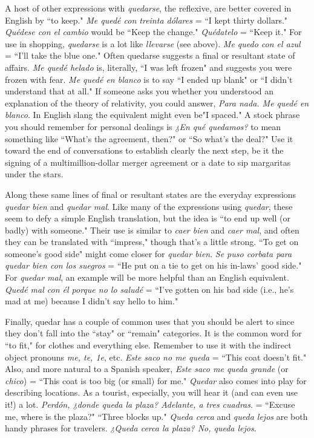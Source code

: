 A host of other expressions with \emph{quedarse}, the reflexive, are
better covered in English by ``to keep." \emph{Me quedé con treinta dólares}
= ``I kept thirty dollars." \emph{Quédese con el cambio} would be ``Keep the
change." \emph{Quédatelo} = ``Keep it." For use in shopping, \emph{quedarse} is a
lot like \emph{llevarse} (see above). \emph{Me quedo con el azul} = ``I'll take the blue
one." Often quedarse suggests a final or resultant state of affairs. \emph{Me
	quedé helado} is, literally, ``I was left frozen" and suggests you were frozen with fear. \emph{Me quedé en blanco} is to say ``I ended up blank" or ``I
didn't understand that at all." If someone asks you whether you understood an explanation of the theory of relativity, you could answer, \emph{Para
	nada. Me quedé en blanco}. In English slang the equivalent might
even be"I spaced." A stock phrase you should remember for personal
dealings is \emph{¿En qué quedamos?} to mean something like ``What's the
agreement, then?" or ``So what's the deal?" Use it toward the end of
conversations to establish clearly the next step, be it the signing of a
multimillion-dollar merger agreement or a date to sip margaritas under
the stars.

Along these same lines of final or resultant states are the everyday expressions \emph{quedar bien} and \emph{quedar mal}. Like many of the expressions using \emph{quedar}, these seem to defy a simple English translation,
but the idea is ``to end up well (or badly) with someone." Their use is
similar to \emph{caer bien} and \emph{caer mal}, and often they can be translated
with ``impress," though that's a little strong. ``To get on someone's
good side" might come closer for \emph{quedar bien}. \emph{Se puso corbata para
	quedar bien con los suegros} = ``He put on a tie to get on his in-laws'
good side." For \emph{quedar mal}, an example will be more helpful than an
English equivalent. \emph{Quedé mal con él porque no lo saludé} = ``I've
gotten on his bad side (i.e., he's mad at me) because I didn't say hello
to him."

Finally, quedar has a couple of common uses that you should
be alert to since they don't fall into the ``stay" or ``remain" categories.
It is the common word for ``to fit," for clothes and everything else. Remember to use it with the indirect object pronouns \emph{me, te, 1e}, etc. \emph{Este
	saco no me queda} = ``This coat doesn't fit." Also, and more natural to
a Spanish speaker, \emph{Este saco me queda grande} (or \emph{chico}) = ``This coat
is too big (or small) for me." \emph{Quedar} also comes into play for describing locations. As a tourist, especially, you will hear it (and can even
use it!) a lot. \emph{Perdón, ¿donde queda la plaza? Adelante, a tres cuadras}.
= ``Excuse me, where is the plaza?" ``Three blocks up." \emph{Queda cerca}
and \emph{queda lejos} are both handy phrases for travelers. \emph{¿Queda cerca la
	plaza? No, queda lejos}.

